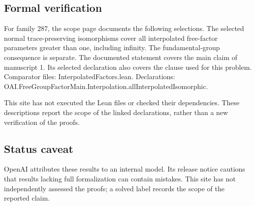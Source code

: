 \documentclass[11pt]{article}
\begin{document}
\subsection{Formal verification}
For family 287, the scope page documents the following selections. The selected normal trace-preserving isomorphisms cover all interpolated free-factor parameters greater than one, including infinity. The fundamental-group consequence is separate. The documented statement covers the main claim of manuscript 1. Its selected declaration also covers the clause used for this problem. Comparator files: InterpolatedFactors.lean. Declarations: OAI.FreeGroupFactorMain.Interpolation.allInterpolatedIsomorphic.

This site has not executed the Lean files or checked their dependencies. These descriptions report the scope of the linked declarations, rather than a new verification of the proofs.

\subsection{Status caveat}
OpenAI attributes these results to an internal model. Its release notice cautions that results lacking full formalization can contain mistakes. This site has not independently assessed the proofs; a solved label records the scope of the reported claim.
\end{document}
